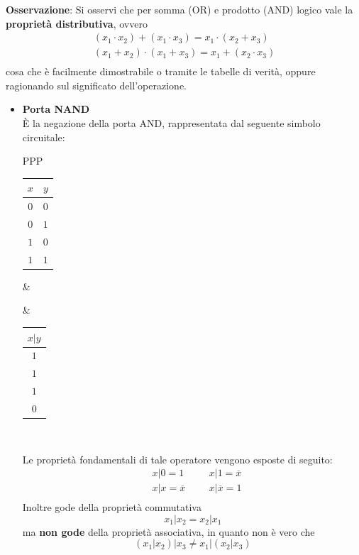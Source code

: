\documentclass[a4paper]{extarticle}
\begin{document}
\vspace{1em}
\noindent
\textbf{Osservazione}: Si osservi che per somma (OR) e prodotto (AND) logico vale la \textbf{proprietà distributiva}, ovvero
\begin{align*}
    (x_1 \cdot x_2) + (x_1 \cdot x_3) = x_1 \cdot (x_2 + x_3)\\
    (x_1 + x_2) \cdot (x_1 + x_3) = x_1 + (x_2 \cdot x_3)\\
\end{align*}
cosa che è facilmente dimostrabile o tramite le tabelle di verità, oppure ragionando sul significato dell'operazione.

\vspace{1em}
\noindent
\begin{itemize}
\item \textbf{Porta NAND}\\
    È la negazione della porta AND, rappresentata dal seguente simbolo circuitale:

    \vspace{1em}
    \noindent
    \begin{tabularx}{\textwidth}{PPP}
    {
        \begin{tabular}{c|c}
             \(x\) & \(y\)\\
             \hline
             $0$ & $0$\\
             $0$ & $1$\\
             $1$ & $0$\\
             $1$ & $1$
        \end{tabular}
    }
    &
    {
    }
    &
    {
        \begin{tabular}{c}
             \(x \vert y\)\\
             \hline
             $1$\\
             $1$\\
             $1$\\
             $0$
        \end{tabular}
    }\\
    \end{tabularx}
    \vspace{1em}
    \noindent
    Le proprietà fondamentali di tale operatore vengono esposte di seguito:
    \begin{align*}
        &x \vert 0 = 1 && &x \vert 1 =\overline{x}\\
        &x \vert x = \overline{x} && &x \vert \overline{x}=1\\
    \end{align*}
    Inoltre gode della proprietà commutativa
    \[x_1 \vert x_2 = x_2 \vert x_1\]
    ma \textbf{non gode} della proprietà associativa, in quanto non è vero che
    \[(x_1 \vert x_2) \vert x_3 \neq x_1 \vert (x_2 \vert x_3)\]


\end{itemize}
\end{document}

